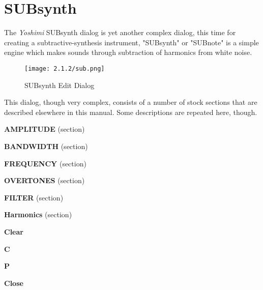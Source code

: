 %
%
%

\section{SUBsynth}
\label{sec:subsynth}

   The \textsl{Yoshimi} SUBsynth dialog is yet another complex dialog, this time
   for creating a subtractive-synthesis instrument,
   "SUBsynth" or "SUBnote" is a simple engine which makes sounds through
   subtraction of harmonics from white noise.  \cite{zyndoc}

\begin{figure}[H]
   \centering
   \texttt{[image: 2.1.2/sub.png]}
   \caption{SUBsynth Edit Dialog}
   \label{fig:subsynth_edit_dialog}
\end{figure}

   This dialog, though very complex, consists of a number of stock sections
   that are described elsewhere in this manual.
   Some descriptions are repeated here, though.

   \begin{enumber}
      \item \textbf{AMPLITUDE} (section)
      \item \textbf{BANDWIDTH} (section)
      \item \textbf{FREQUENCY} (section)
      \item \textbf{OVERTONES} (section)
      \item \textbf{FILTER} (section)
      \item \textbf{Harmonics} (section)
      \item \textbf{Clear}
      \item \textbf{C}
      \item \textbf{P}
      \item \textbf{Close}
   \end{enumber}

